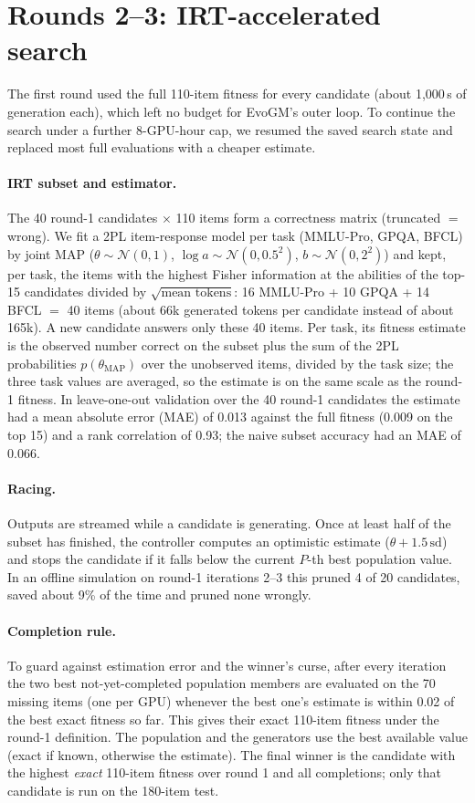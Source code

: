 \section{Rounds 2--3: IRT-accelerated search}\label{sec:r2}
The first round used the full 110-item fitness for every candidate (about 1{,}000\,s of generation each), which left no budget for EvoGM's outer loop. To continue the search under a further 8-GPU-hour cap, we resumed the saved search state and replaced most full evaluations with a cheaper estimate.

\paragraph{IRT subset and estimator.} The 40 round-1 candidates $\times$ 110 items form a correctness matrix (truncated $=$ wrong). We fit a 2PL item-response model per task (MMLU-Pro, GPQA, BFCL) by joint MAP ($\theta\sim\mathcal N(0,1)$, $\log a\sim\mathcal N(0,0.5^2)$, $b\sim\mathcal N(0,2^2)$) and kept, per task, the items with the highest Fisher information at the abilities of the top-15 candidates divided by $\sqrt{\text{mean tokens}}$: 16 MMLU-Pro + 10 GPQA + 14 BFCL $=$ 40 items (about 66k generated tokens per candidate instead of about 165k). A new candidate answers only these 40 items. Per task, its fitness estimate is the observed number correct on the subset plus the sum of the 2PL probabilities $p(\theta_{\text{MAP}})$ over the unobserved items, divided by the task size; the three task values are averaged, so the estimate is on the same scale as the round-1 fitness. In leave-one-out validation over the 40 round-1 candidates the estimate had a mean absolute error (MAE) of 0.013 against the full fitness (0.009 on the top 15) and a rank correlation of 0.93; the naive subset accuracy had an MAE of 0.066.

\paragraph{Racing.} Outputs are streamed while a candidate is generating. Once at least half of the subset has finished, the controller computes an optimistic estimate ($\theta+1.5\,\text{sd}$) and stops the candidate if it falls below the current $P$-th best population value. In an offline simulation on round-1 iterations 2--3 this pruned 4 of 20 candidates, saved about 9\% of the time and pruned none wrongly.

\paragraph{Completion rule.} To guard against estimation error and the winner's curse, after every iteration the two best not-yet-completed population members are evaluated on the 70 missing items (one per GPU) whenever the best one's estimate is within 0.02 of the best exact fitness so far. This gives their exact 110-item fitness under the round-1 definition. The population and the generators use the best available value (exact if known, otherwise the estimate). The final winner is the candidate with the highest \emph{exact} 110-item fitness over round 1 and all completions; only that candidate is run on the 180-item test.

